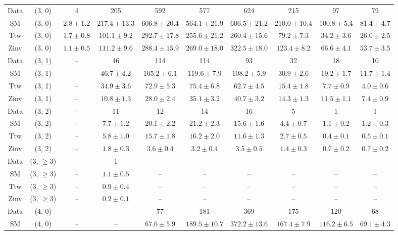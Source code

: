 \begin{table}[h!]
{\begin{tabular}{cccccccccc}
	Data & (3, 0) & 4 & 205 & 592 & 577 & 624 & 215 & 97 & 79 \\[0.5ex] 
	SM & (3, 0) & $2.8\pm 1.2$ & $217.4\pm 13.3$ & $606.8\pm 20.4$ & $564.1\pm 21.9$ & $606.5\pm 21.2$ & $210.0\pm 10.4$ & $100.8\pm 5.4$ & $81.4\pm 4.7$ \\[0.5ex] 
	Ttw & (3, 0) & $1.7\pm 0.8$ & $101.1\pm 9.2$ & $292.7\pm 17.8$ & $255.6\pm 21.2$ & $260.4\pm 15.6$ & $79.2\pm 7.3$ & $34.2\pm 3.6$ & $26.0\pm 2.5$ \\[0.5ex] 
	Zinv & (3, 0) & $1.1\pm 0.5$ & $111.2\pm 9.6$ & $288.4\pm 15.9$ & $269.0\pm 18.0$ & $322.5\pm 18.0$ & $123.4\pm 8.2$ & $66.6\pm 4.1$ & $53.7\pm 3.5$ \\[0.5ex] 
	Data & (3, 1) & -- & 46 & 114 & 114 & 93 & 32 & 18 & 10 \\[0.5ex] 
	SM & (3, 1) & -- & $46.7\pm 4.2$ & $105.2\pm 6.1$ & $119.6\pm 7.9$ & $108.2\pm 5.9$ & $30.9\pm 2.6$ & $19.2\pm 1.7$ & $11.7\pm 1.4$ \\[0.5ex] 
	Ttw & (3, 1) & -- & $34.9\pm 3.6$ & $72.9\pm 5.3$ & $75.4\pm 6.8$ & $62.7\pm 4.5$ & $15.4\pm 1.8$ & $7.7\pm 0.9$ & $4.0\pm 0.6$ \\[0.5ex] 
	Zinv & (3, 1) & -- & $10.8\pm 1.3$ & $28.0\pm 2.4$ & $35.1\pm 3.2$ & $40.7\pm 3.2$ & $14.3\pm 1.3$ & $11.5\pm 1.1$ & $7.4\pm 0.9$ \\[0.5ex] 
	Data & (3, 2) & -- & 11 & 12 & 14 & 16 & 5 & 1 & 1 \\[0.5ex] 
	SM & (3, 2) & -- & $7.7\pm 1.2$ & $20.1\pm 2.2$ & $21.2\pm 2.3$ & $15.6\pm 1.6$ & $4.4\pm 0.7$ & $1.1\pm 0.2$ & $1.2\pm 0.3$ \\[0.5ex] 
	Ttw & (3, 2) & -- & $5.8\pm 1.0$ & $15.7\pm 1.8$ & $16.2\pm 2.0$ & $11.6\pm 1.3$ & $2.7\pm 0.5$ & $0.4\pm 0.1$ & $0.5\pm 0.1$ \\[0.5ex] 
	Zinv & (3, 2) & -- & $1.8\pm 0.3$ & $3.6\pm 0.4$ & $3.2\pm 0.4$ & $3.5\pm 0.5$ & $1.4\pm 0.3$ & $0.7\pm 0.2$ & $0.7\pm 0.2$ \\[0.5ex] 
	Data & (3, $\ge3$) & -- & 1 & -- & -- & -- & -- & -- & -- \\[0.5ex] 
	SM & (3, $\ge3$) & -- & $1.1\pm 0.5$ & -- & -- & -- & -- & -- & -- \\[0.5ex] 
	Ttw & (3, $\ge3$) & -- & $0.9\pm 0.4$ & -- & -- & -- & -- & -- & -- \\[0.5ex] 
	Zinv & (3, $\ge3$) & -- & $0.2\pm 0.1$ & -- & -- & -- & -- & -- & -- \\[0.5ex] 
	Data & (4, 0) & -- & -- & 77 & 181 & 369 & 175 & 120 & 68 \\[0.5ex] 
	SM & (4, 0) & -- & -- & $67.6\pm 5.9$ & $189.5\pm 10.7$ & $372.2\pm 13.6$ & $167.4\pm 7.9$ & $116.2\pm 6.5$ & $69.1\pm 4.3$ \\[0.5ex] 

\end{tabular}}
\end{table}
